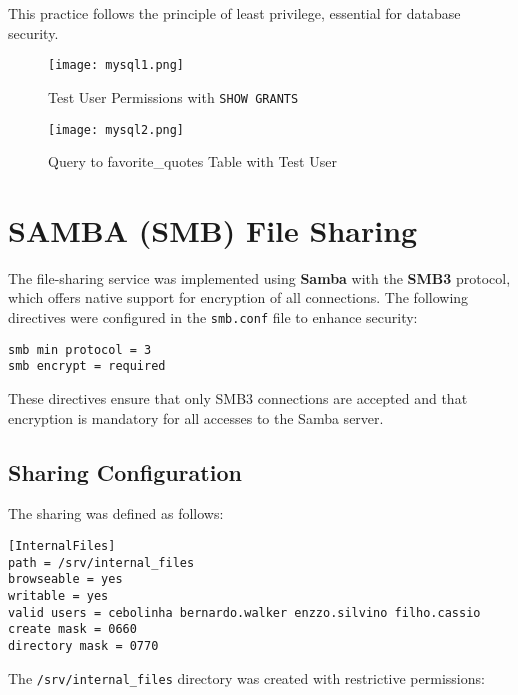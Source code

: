 \documentclass[12pt]{report}
\begin{document}
This practice follows the principle of least privilege, essential for database security.

\begin{figure}[h]
    \centering
    \texttt{[image: mysql1.png]}
    \caption{Test User Permissions with \texttt{SHOW GRANTS}}
    \label{fig:mysql-grants}
\end{figure}

\begin{figure}[h]
    \centering
    \texttt{[image: mysql2.png]}
    \caption{Query to favorite\_quotes Table with Test User}
    \label{fig:mysql-select}
\end{figure}

\clearpage

\section*{SAMBA (SMB) File Sharing}

The file-sharing service was implemented using \textbf{Samba} with the \textbf{SMB3} protocol, which offers native support for encryption of all connections. The following directives were configured in the \texttt{smb.conf} file to enhance security:

\begin{lstlisting}[caption={SMB Protocol Security Configuration}]
smb min protocol = 3
smb encrypt = required
\end{lstlisting}

These directives ensure that only SMB3 connections are accepted and that encryption is mandatory for all accesses to the Samba server.

\subsection*{Sharing Configuration}

The sharing was defined as follows:

\begin{lstlisting}[caption={Sharing Block in smb.conf}]
[InternalFiles]
path = /srv/internal_files
browseable = yes
writable = yes
valid users = cebolinha bernardo.walker enzzo.silvino filho.cassio
create mask = 0660
directory mask = 0770
\end{lstlisting}

The \texttt{/srv/internal\_files} directory was created with restrictive permissions:
\end{document}
